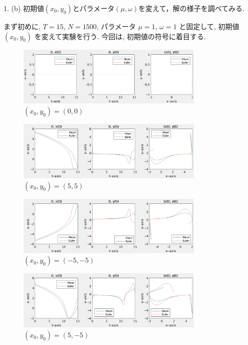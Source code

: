 \documentclass[11pt]{jsarticle}
\begin{document}
\subsubsection{}
\begin{itembox}[l]{1. (b)}
初期値$(x_{0},y_{0})$とパラメータ$(\mu,\omega)$を変えて，解の様子を調べてみる. 
\end{itembox}

まず初めに, $T = 15$, $N = 1500$, パラメータ $\mu = 1$, $\omega = 1$ と固定して, 初期値 $(x_{0}, y_{0})$ を変えて実験を行う. 今回は, 初期値の符号に着目する. 

\begin{figure}[htbp]
\centering
\includegraphics[width=9cm]{images/1_b_1_zero*.png}
\caption{$(x_{0}, y_{0}) = (0, 0)$}
\end{figure}

\begin{figure}[htbp]
\centering
\includegraphics[width=9cm]{images/1_b_1_pp*.png}
\caption{$(x_{0}, y_{0}) = (5, 5)$ }
\end{figure}

\begin{figure}[htbp]
\centering
\includegraphics[width=9cm]{images/1_b_1_nn*.png}
\caption{$(x_{0}, y_{0}) = (-5, -5)$}
\end{figure}

\begin{figure}[htbp]
\centering
\includegraphics[width=9cm]{images/1_b_1_pn*.png}
\caption{$(x_{0}, y_{0}) = (5, -5)$}
\end{figure}
\end{document}
